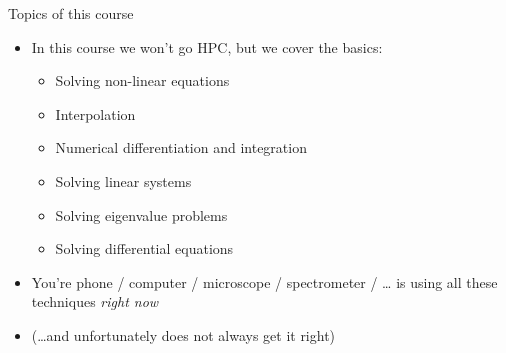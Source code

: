 \begin{frame}{Topics of this course}
    \begin{itemize}
        \item In this course we won't go HPC, but we cover the basics:
    \begin{itemize}
        \item Solving non-linear equations
        \item Interpolation
        \item Numerical differentiation and integration
        \item Solving linear systems
        \item Solving eigenvalue problems
        \item Solving differential equations
    \end{itemize}
    \end{itemize}
    \vspace{2em}
    \begin{itemize}
        \item You're phone / computer / microscope / spectrometer / \ldots \linebreak
            is using all these techniques \emph{right now}
        \vspace{0.5em}
        \item \textcolor{grey5}{(\ldots and unfortunately does not always get it right)}
    \end{itemize}
\end{frame}
